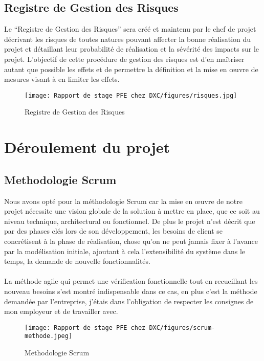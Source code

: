 \subsection{Registre de Gestion des Risques} 

Le “Registre de Gestion des Risques” sera créé et maintenu par le chef de projet
décrivant les risques de toutes natures pouvant affecter la bonne réalisation du projet et
détaillant leur probabilité de réalisation et la sévérité des impacts sur le projet. L’objectif de cette procédure de gestion des risques est d’en maîtriser autant que possible les effets et de permettre la définition et la mise en œuvre de mesures visant à en limiter les effets.

\begin{figure}[!h]
    \centering
    \texttt{[image: Rapport de stage PFE chez DXC/figures/risques.jpg]}
    \caption{Registre de Gestion des Risques}
\end{figure}

\section{Déroulement du projet}

\subsection{Methodologie Scrum}

Nous avons opté pour la méthodologie Scrum car la mise en œuvre de notre projet nécessite une vision globale de la solution à mettre en place, que ce soit au niveau technique, architectural ou fonctionnel. De plus le projet n’est décrit que par des phases clés lors de son développement, les besoins de client se concrétisent à la phase de réalisation, chose qu’on ne peut jamais fixer à l’avance par la modélisation initiale, ajoutant à cela l’extensibilité du système dans le temps, la demande de nouvelle fonctionnalités. 
\\
\\
La méthode agile qui permet une vérification fonctionnelle tout en recueillant les nouveau besoins s’est montré indispensable dans ce cas, en plus c’est la méthode demandée par l’entreprise, j’étais dans l’obligation de respecter les consignes de mon employeur et de travailler avec.

\begin{figure}[!h]
    \centering
    \texttt{[image: Rapport de stage PFE chez DXC/figures/scrum-methode.jpeg]}
    \caption{Methodologie Scrum}
\end{figure}

